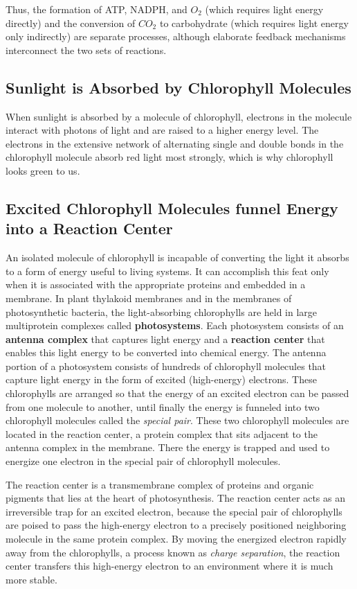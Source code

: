 Thus, the formation of ATP, NADPH, and $O_2$ (which requires light energy
directly) and the conversion of $CO_2$ to carbohydrate (which requires light
energy only indirectly) are separate processes, although elaborate feedback
mechanisms interconnect the two sets of reactions.

\subsection{Sunlight is Absorbed by Chlorophyll Molecules}

When sunlight is absorbed by a molecule of chlorophyll, electrons in the
molecule interact with photons of light and are raised to a higher energy
level. The electrons in the extensive network of alternating single and
double bonds in the chlorophyll molecule absorb red light
most strongly, which is why chlorophyll looks green to us.

\subsection{Excited Chlorophyll Molecules funnel Energy into a Reaction Center}

An isolated molecule of chlorophyll is incapable of converting the light
it absorbs to a form of energy useful to living systems. It can accomplish
this feat only when it is associated with the appropriate proteins
and embedded in a membrane. In plant thylakoid membranes and in the
membranes of photosynthetic bacteria, the light-absorbing chlorophylls
are held in large multiprotein complexes called \textbf{photosystems}. Each
photosystem consists of an \textbf{antenna complex} that captures light energy
and a \textbf{reaction center} that enables this light energy to be converted
into chemical energy. The antenna portion of a photosystem consists of
hundreds of chlorophyll molecules that capture light energy in the form
of excited (high-energy) electrons. These chlorophylls are arranged so
that the energy of an excited electron can be passed from one molecule
to another, until finally the energy is funneled into two chlorophyll
molecules called the \textit{special pair}. These two chlorophyll
molecules are located in the reaction center, a protein complex that sits
adjacent to the antenna complex in the membrane. There the energy is
trapped and used to energize one electron in the special pair of chlorophyll
molecules.

The reaction center is a transmembrane complex of proteins and organic
pigments that lies at the heart of photosynthesis. The reaction center
acts as an irreversible trap for an excited electron, because the special
pair of chlorophylls are poised to pass the high-energy electron to a precisely
positioned neighboring molecule in the same protein complex.
By moving the energized electron rapidly away from the chlorophylls,
a process known as \textit{charge separation}, the reaction center transfers this
high-energy electron to an environment where it is much more stable.

